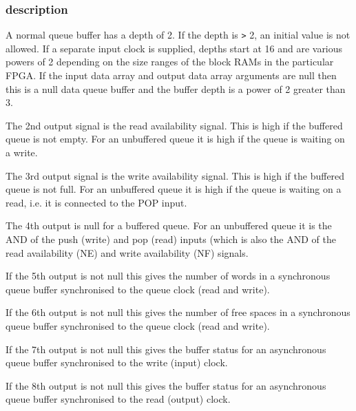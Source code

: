 \documentclass[10pt,a4paper,twoside,fleqn]{book}
\begin{document}
                \subsubsection{description}

                    A normal queue buffer has a depth of 2. If the depth is \verb'>' 2, an
                    initial value is not allowed. If a separate input clock is
                    supplied, depths start at 16 and are various powers of 2
                    depending on the size ranges of the block RAMs in the particular
                    FPGA. If the input data array and output data array arguments
                    are null then this is a null data queue buffer and the buffer
                    depth is a power of 2 greater than 3.
                
                    The 2nd output signal is the read availability signal. This is
                    high if the buffered queue is not empty. For an unbuffered queue
                    it is high if the queue is waiting on a write.

                    The 3rd output signal is the write availability signal. This is
                    high if the buffered queue is not full. For an unbuffered queue
                    it is high if the queue is waiting on a read, i.e. it is
                    connected to the POP input.

                    The 4th output is null for a buffered queue. For an unbuffered
                    queue it is the AND of the push (write) and pop (read) inputs
                    (which is also the AND of the read availability (NE) and write
                    availability (NF) signals.

                    If the 5th output is not null this gives the number of words in
                    a synchronous queue buffer synchronised to the queue clock (read
                    and write).

                    If the 6th output is not null this gives the number of free
                    spaces in a synchronous queue buffer synchronised to the queue
                    clock (read and write).

                    If the 7th output is not null this gives the buffer status for
                    an asynchronous queue buffer synchronised to the write (input)
                    clock.

                    If the 8th output is not null this gives the buffer status for
                    an asynchronous queue buffer synchronised to the read (output)
                    clock.
\end{document}
